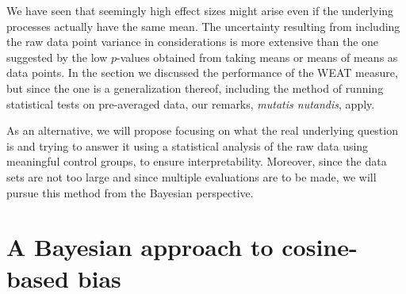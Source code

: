 \documentclass{clv3}
\begin{document}
We have seen that seemingly high effect sizes might arise even if the
underlying processes actually have the same mean. The uncertainty
resulting from including the raw data point variance in considerations
is more extensive than the one suggested by the low \(p\)-values
obtained from taking means or means of means as data points. In the
section we discussed the performance of the \textsf{WEAT} measure, but
since the \citep{Manzini2019blackToCriminal} one is a generalization thereof, including the method
of running statistical tests on pre-averaged data, our remarks,
\emph{mutatis nutandis}, apply.

As an alternative, we will propose focusing on what the
real underlying question is and trying to answer it using a statistical
analysis of the raw data using meaningful control groups, to ensure
interpretability. Moreover, since the data sets are not too large and
since multiple evaluations are to be made, we will pursue this method
from the Bayesian perspective.






























































\hypertarget{a-bayesian-approach-to-cosine-based-bias}{%
\section{A Bayesian approach to cosine-based
bias}\label{a-bayesian-approach-to-cosine-based-bias}}
\end{document}
